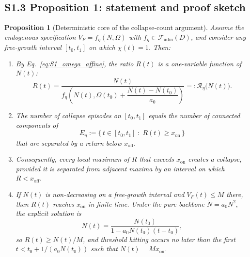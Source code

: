 \documentclass[11pt]{article}
\newtheorem{proposition}{Proposition}
\begin{document}
\subsection*{S1.3 Proposition 1: statement and proof sketch}

\begin{proposition}[Deterministic core of the collapse-count argument]
\label{prop:S1_collapsecount}
Assume the endogenous specification \(V_F=f_\eta(N,\Omega)\) with \(f_\eta\in\mathcal F_{\mathrm{adm}}(D)\),
and consider any free-growth interval \([t_0,t_1]\) on which \(\chi(t)=1\).
Then:
\begin{enumerate}[label=(\roman*)]
\item By Eq.~\eqref{eq:S1_omega_affine}, the ratio \(R(t)\) is a one-variable function of \(N(t)\):
\begin{equation}
R(t)=
\frac{N(t)}
{f_\eta\!\left(N(t),\Omega(t_0)+\dfrac{N(t)-N(t_0)}{a_0}\right)}
=: \mathcal R_\eta\!\bigl(N(t)\bigr).
\label{eq:S1_R_as_function_of_N}
\end{equation}
\item The number of collapse episodes on \([t_0,t_1]\) equals the number of connected components of
\begin{equation}
E_\eta:=
\{\,t\in[t_0,t_1]\;:\;R(t)\ge x_{\mathrm{on}}\,\}
\label{eq:S1_exceedance_set}
\end{equation}
that are separated by a return below \(x_{\mathrm{off}}\).
\item Consequently, every local maximum of \(R\) that exceeds \(x_{\mathrm{on}}\) creates a collapse,
provided it is separated from adjacent maxima by an interval on which \(R<x_{\mathrm{off}}\).
\item If \(N(t)\) is non-decreasing on a free-growth interval and \(V_F(t)\le M\) there, then
\(R(t)\) reaches \(x_{\mathrm{on}}\) in finite time. Under the pure backbone
$\dot N=a_0N^2,$
the explicit solution is
\begin{equation}
N(t)=\frac{N(t_0)}{1-a_0N(t_0)(t-t_0)},
\label{eq:S1_N_explicit}
\end{equation}
so \(R(t)\ge N(t)/M\), and threshold hitting occurs no later than the first \(t<t_0+1/(a_0N(t_0))\)
such that \(N(t)=Mx_{\mathrm{on}}\).
\end{enumerate}
\end{proposition}
\end{document}
